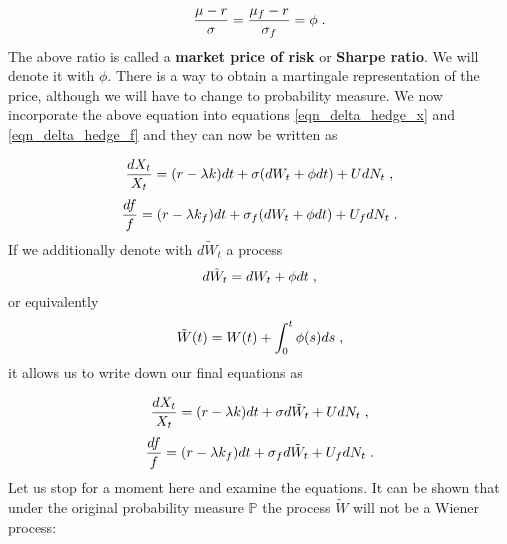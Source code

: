 \documentclass[times, utf8, diplomski]{fer}
\begin{document}
\begin{equation} \label{eqn_sharpe}
	\frac{\mu - r}{\sigma} = \frac{\mu_f - r}{\sigma_f} = \phi \hspace{0.1cm}.
\end{equation}
The above ratio is called a \textbf{market price of risk} or  \textbf{Sharpe ratio}. We will denote it with $\phi$. There is a way to obtain a martingale representation of the price, although we will have to change to probability measure. We now incorporate the above equation into equations \ref{eqn_delta_hedge_x} and \ref{eqn_delta_hedge_f} and they can now be written as

$$ \frac{dX_t}{X_t} = (r - \lambda k)dt + \sigma (dW_t + \phi dt) + UdN_t \hspace{0.1cm},$$
$$ \frac{df}{f} = (r - \lambda k_f)dt + \sigma_f (dW_t + \phi dt) + U_fdN_t  \hspace{0.1cm}.$$
If we additionally denote with $d\tilde{W}_t$ a process
\begin{equation}
	d\tilde{W}_t = dW_t + \phi dt \hspace{0.1cm},
\end{equation} or equivalently
\begin{equation}
	\tilde{W}(t) = W(t) + \int_0^t \phi(s) ds \hspace{0.1cm},
\end{equation} it allows us to write down our final equations as

\begin{equation}\label{eqn_x_new_measure}
	\frac{dX_t}{X_t} = (r - \lambda k)dt + \sigma d\tilde{W}_t + UdN_t \hspace{0.1cm},
\end{equation}
\begin{equation}
	\frac{df}{f} = (r - \lambda k_f)dt + \sigma_f d\tilde{W}_t + U_fdN_t \hspace{0.1cm}.
\end{equation}
Let us stop for a moment here and examine the equations. It can be shown that under the original probability measure $\mathbb{P}$ the process $\tilde{W}$ will not be a Wiener process:
\end{document}
